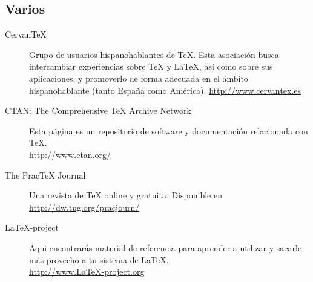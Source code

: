 		\subsection{Varios}
					\begin{description}
											\item[Cervan\TeX{}] Grupo de usuarios hispanohablantes de \TeX{}. Esta asociaci\'on 
											busca intercambiar experiencias sobre \TeX{} y \LaTeX{}, as\'i como sobre sus aplicaciones, 
											y promoverlo de forma adecuada en el \'ambito hispanohablante (tanto Espa\~na como Am\'erica).
											\url{http://www.cervantex.es}
											
											\item[CTAN: The Comprehensive \TeX{} Archive Network] Esta p\'agina es un repositorio 
											de software y documentaci\'on relacionada con \TeX{}.\\ \url{http://www.ctan.org/}
											
											\item[The Prac\TeX{} Journal] Una revista de \TeX{} online y gratuita. 
											Disponible en\\  \url{http://dw.tug.org/pracjourn/} 
											
											\item[LaTeX-project]
											Aqui encontrar\'as material de referencia para aprender a utilizar y sacarle m\'as provecho a tu sistema 
											de \LaTeX{}.\\  \url{http://www.LaTeX-project.org} 
											
					\end{description}
											
					
